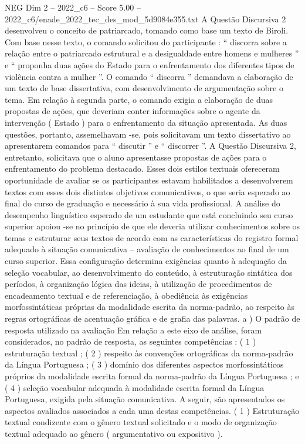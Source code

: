 \begin{textsample}{NEG Dim 2 – 2022\_c6 – Score 5.00 – 2022\_c6/enade\_2022\_tec\_des\_mod\_5d9084e355.txt}
A Questão Discursiva 2 desenvolveu o conceito de patriarcado, tomando como base um texto de Biroli.
Com base nesse texto, o comando solicitou do participante : “ discorra sobre a relação entre o patriarcado estrutural e a desigualdade entre homens e mulheres ” e “ proponha duas ações do Estado para o enfrentamento dos diferentes tipos de violência contra a mulher ”.
O comando “ discorra ” demandava a elaboração de um texto de base dissertativa, com desenvolvimento de argumentação sobre o tema.
Em relação à segunda parte, o comando exigia a elaboração de duas propostas de ações, que deveriam conter informações sobre o agente da intervenção ( Estado ) para o enfrentamento da situação apresentada.
As duas questões, portanto, assemelhavam -se, pois solicitavam um texto dissertativo ao apresentarem comandos para “ discutir ” e “ discorrer ”.
A Questão Discursiva 2, entretanto, solicitava que o aluno apresentasse propostas de ações para o enfrentamento do problema destacado.
Esses dois estilos textuais ofereceram oportunidade de avaliar se os participantes estavam habilitados a desenvolverem textos com esses dois distintos objetivos comunicativos, o que seria esperado ao final do curso de graduação e necessário à sua vida profissional.
A análise do desempenho linguístico esperado de um estudante que está concluindo seu curso superior apoiou -se no princípio de que ele deveria utilizar conhecimentos sobre os temas e estruturar seus textos de acordo com as características do registro formal adequado à situação comunicativa – avaliação de conhecimentos ao final de um curso superior.
Essa configuração determina exigências quanto à adequação da seleção vocabular, ao desenvolvimento do conteúdo, à estruturação sintática dos períodos, à organização lógica das ideias, à utilização de procedimentos de encadeamento textual e de referenciação, à obediência às exigências morfossintáticas próprias da modalidade escrita da norma-padrão, ao respeito às regras ortográficas de acentuação gráfica e de grafia das palavras. a ) O padrão de resposta utilizado na avaliação Em relação a este eixo de análise, foram considerados, no padrão de resposta, as seguintes competências : ( 1 ) estruturação textual ; ( 2 ) respeito às convenções ortográficas da norma-padrão da Língua Portuguesa ; ( 3 ) domínio dos diferentes aspectos morfossintáticos próprios da modalidade escrita formal da norma-padrão da Língua Portuguesa ; e ( 4 ) seleção vocabular adequada à modalidade escrita formal da Língua Portuguesa, exigida pela situação comunicativa.
A seguir, são apresentados os aspectos avaliados associados a cada uma destas competências. ( 1 ) Estruturação textual condizente com o gênero textual solicitado e o modo de organização textual adequado ao gênero ( argumentativo ou expositivo ).

\end{textsample}
